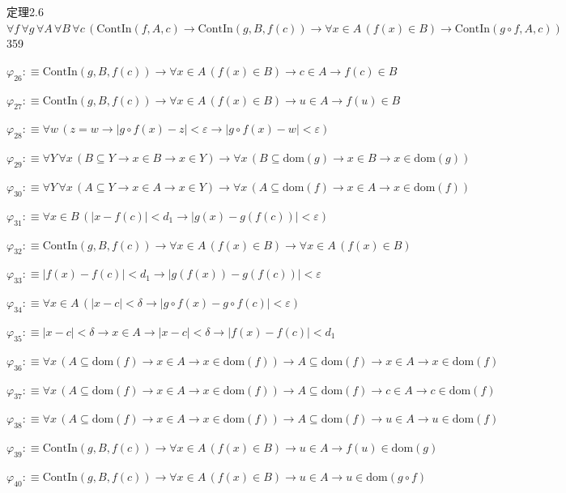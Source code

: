 \begin{fullproof}{定理2.6}{$\forall f\,\forall g\,\forall A\,\forall B\,\forall c\,(\mathrm{ContIn}(f,A,c) \to \mathrm{ContIn}(g,B,f(c)) \to \forall x \in A\,(f(x) \in B) \to \mathrm{ContIn}(g \circ f,A,c))$}{359}
\begin{abbrevlist}
\item $\varphi_{26} :\equiv \mathrm{ContIn}(g,B,f(c)) \to \forall x \in A\,(f(x) \in B) \to c \in A \to f(c) \in B$
\item $\varphi_{27} :\equiv \mathrm{ContIn}(g,B,f(c)) \to \forall x \in A\,(f(x) \in B) \to u \in A \to f(u) \in B$
\item $\varphi_{28} :\equiv \forall w\,(z = w \to \lvert g \circ f(x) - z \rvert < \varepsilon \to \lvert g \circ f(x) - w \rvert < \varepsilon)$
\item $\varphi_{29} :\equiv \forall Y\,\forall x\,(B \subseteq Y \to x \in B \to x \in Y) \to \forall x\,(B \subseteq \mathrm{dom}(g) \to x \in B \to x \in \mathrm{dom}(g))$
\item $\varphi_{30} :\equiv \forall Y\,\forall x\,(A \subseteq Y \to x \in A \to x \in Y) \to \forall x\,(A \subseteq \mathrm{dom}(f) \to x \in A \to x \in \mathrm{dom}(f))$
\item $\varphi_{31} :\equiv \forall x \in B\,(\lvert x - f(c) \rvert < d_{1} \to \lvert g(x) - g(f(c)) \rvert < \varepsilon)$
\item $\varphi_{32} :\equiv \mathrm{ContIn}(g,B,f(c)) \to \forall x \in A\,(f(x) \in B) \to \forall x \in A\,(f(x) \in B)$
\item $\varphi_{33} :\equiv \lvert f(x) - f(c) \rvert < d_{1} \to \lvert g(f(x)) - g(f(c)) \rvert < \varepsilon$
\item $\varphi_{34} :\equiv \forall x \in A\,(\lvert x - c \rvert < \delta \to \lvert g \circ f(x) - g \circ f(c) \rvert < \varepsilon)$
\item $\varphi_{35} :\equiv \lvert x - c \rvert < \delta \to x \in A \to \lvert x - c \rvert < \delta \to \lvert f(x) - f(c) \rvert < d_{1}$
\item $\varphi_{36} :\equiv \forall x\,(A \subseteq \mathrm{dom}(f) \to x \in A \to x \in \mathrm{dom}(f)) \to A \subseteq \mathrm{dom}(f) \to x \in A \to x \in \mathrm{dom}(f)$
\item $\varphi_{37} :\equiv \forall x\,(A \subseteq \mathrm{dom}(f) \to x \in A \to x \in \mathrm{dom}(f)) \to A \subseteq \mathrm{dom}(f) \to c \in A \to c \in \mathrm{dom}(f)$
\item $\varphi_{38} :\equiv \forall x\,(A \subseteq \mathrm{dom}(f) \to x \in A \to x \in \mathrm{dom}(f)) \to A \subseteq \mathrm{dom}(f) \to u \in A \to u \in \mathrm{dom}(f)$
\item $\varphi_{39} :\equiv \mathrm{ContIn}(g,B,f(c)) \to \forall x \in A\,(f(x) \in B) \to u \in A \to f(u) \in \mathrm{dom}(g)$
\item $\varphi_{40} :\equiv \mathrm{ContIn}(g,B,f(c)) \to \forall x \in A\,(f(x) \in B) \to u \in A \to u \in \mathrm{dom}(g \circ f)$

\end{abbrevlist}
\end{fullproof}
